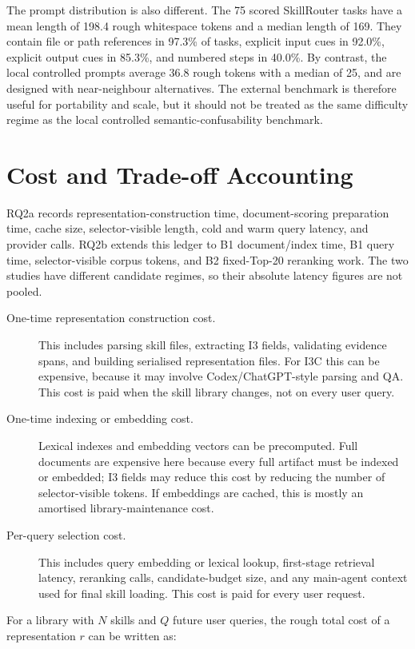 The prompt distribution is also different. The 75 scored SkillRouter tasks have a mean length of 198.4 rough whitespace tokens and a median length of 169. They contain file or path references in 97.3\% of tasks, explicit input cues in 92.0\%, explicit output cues in 85.3\%, and numbered steps in 40.0\%. By contrast, the local controlled prompts average 36.8 rough tokens with a median of 25, and are designed with near-neighbour alternatives. The external benchmark is therefore useful for portability and scale, but it should not be treated as the same difficulty regime as the local controlled semantic-confusability benchmark.

\section{Cost and Trade-off Accounting}

RQ2a records representation-construction time, document-scoring preparation time, cache size, selector-visible length, cold and warm query latency, and provider calls. RQ2b extends this ledger to B1 document/index time, B1 query time, selector-visible corpus tokens, and B2 fixed-Top-20 reranking work. The two studies have different candidate regimes, so their absolute latency figures are not pooled.

\begin{description}
  \item[One-time representation construction cost.] This includes parsing skill files, extracting I3 fields, validating evidence spans, and building serialised representation files. For I3C this can be expensive, because it may involve Codex/ChatGPT-style parsing and QA. This cost is paid when the skill library changes, not on every user query.
  \item[One-time indexing or embedding cost.] Lexical indexes and embedding vectors can be precomputed. Full documents are expensive here because every full artifact must be indexed or embedded; I3 fields may reduce this cost by reducing the number of selector-visible tokens. If embeddings are cached, this is mostly an amortised library-maintenance cost.
  \item[Per-query selection cost.] This includes query embedding or lexical lookup, first-stage retrieval latency, reranking calls, candidate-budget size, and any main-agent context used for final skill loading. This cost is paid for every user request.
\end{description}

For a library with \(N\) skills and \(Q\) future user queries, the rough total cost of a representation \(r\) can be written as:


